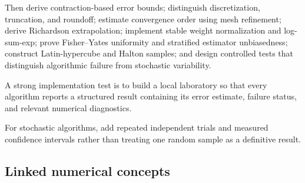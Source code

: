 Then derive contraction-based error bounds; distinguish discretization, truncation, and roundoff; estimate convergence order using mesh refinement; derive Richardson extrapolation; implement stable weight normalization and log-sum-exp; prove Fisher--Yates uniformity and stratified estimator unbiasedness; construct Latin-hypercube and Halton samples; and design controlled tests that distinguish algorithmic failure from stochastic variability.

A strong implementation test is to build a local laboratory so that every algorithm reports a structured result containing its error estimate, failure status, and relevant numerical diagnostics.

For stochastic algorithms, add repeated independent trials and measured confidence intervals rather than treating one random sample as a definitive result.

\subsection{Linked numerical concepts}\label{02-foundations-ii-ch039-linked-numerical-concepts}


